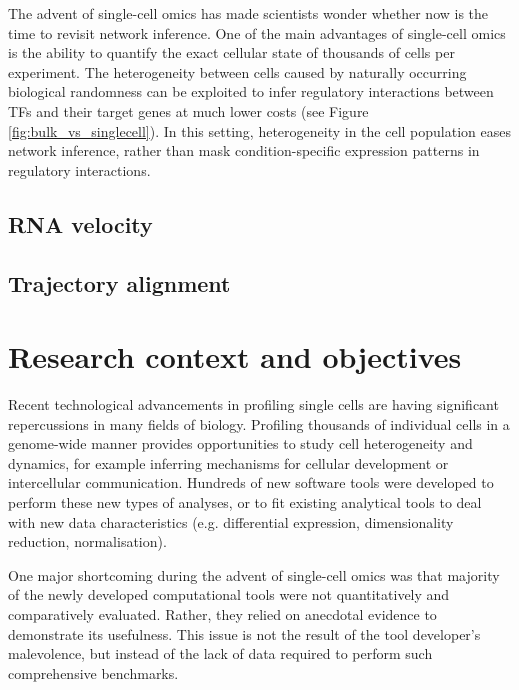 The advent of single-cell omics has made scientists wonder whether now is the time to revisit network inference\cite{stegle_computationalanalyticalchallenges_2015}. 
One of the main advantages of single-cell omics is the ability to quantify the exact cellular state of thousands of cells per experiment. The heterogeneity between cells caused by naturally occurring biological randomness\cite{padovan-merhar_usingvariabilitygene_2013} can be exploited to infer regulatory interactions between TFs and their target genes at much lower costs (see Figure \ref{fig:bulk_vs_singlecell}).
In this setting, heterogeneity in the cell population eases network inference, rather than mask condition-specific expression patterns in regulatory interactions.


\subsection{RNA velocity}

\subsection{Trajectory alignment}

\section{Research context and objectives}
Recent technological advancements in profiling single cells are having significant repercussions in many fields of biology. Profiling thousands of individual cells in a genome-wide manner provides opportunities to study cell heterogeneity and dynamics, for example inferring mechanisms for cellular development or intercellular communication. 
Hundreds of new software tools were developed\cite{zappia_exploringsinglecellrnaseq_2018} to perform these new types of analyses, or to fit existing analytical tools to deal with new data characteristics (e.g. differential expression, dimensionality reduction, normalisation). 

One major shortcoming during the advent of single-cell omics was that majority of the newly developed computational tools were not quantitatively and comparatively evaluated. Rather, they relied on anecdotal evidence to demonstrate its usefulness. This issue is not the result of the tool developer's malevolence, but instead of the lack of data required to perform such comprehensive benchmarks.

